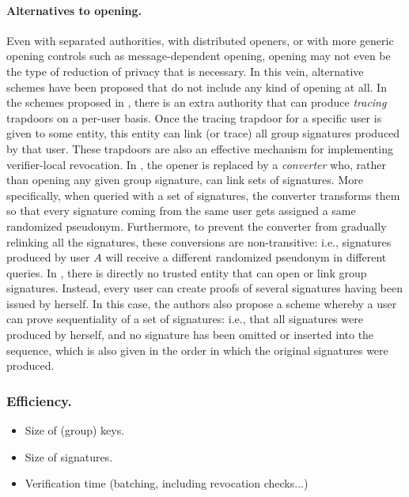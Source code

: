 \paragraph{Alternatives to opening.}
%
Even with separated authorities, with distributed openers, or with more generic
opening controls such as message-dependent opening, opening may not even be
the type of reduction of privacy that is necessary. In this vein, alternative
schemes have been proposed that do not include any kind of
opening at all.
%
In the schemes proposed in \cite{kty04,cpy06,bcly08}, there is an extra
authority that can produce \emph{tracing} trapdoors on a per-user basis.
Once the tracing trapdoor for a specific user is given to some entity, this
entity can link (or trace) all group signatures produced by that user.
These trapdoors are also an effective mechanism for implementing verifier-local
revocation.
%
In \cite{gl19}, the opener is replaced by a \emph{converter} who, rather than
opening any given group signature, can link sets of signatures. More
specifically, when queried with a set of signatures, the converter transforms
them so that every signature coming from the same user gets assigned a same
randomized pseudonym. Furthermore, to prevent the converter from gradually
relinking all the signatures, these conversions are non-transitive: i.e.,
signatures produced by user $A$ will receive a different randomized pseudonym in
different queries.
%
In \cite{dl21}, there is directly no trusted entity that can open or link group
signatures. Instead, every user can create proofs of several signatures having
been issued by herself. In this case, the authors also propose a scheme whereby
a user can prove sequentiality of a set of signatures: i.e., that all signatures
were produced by herself, and no signature has been omitted or inserted into the
sequence, which is also given in the order in which the original signatures were
produced.

\subsubsection{Efficiency.}


\begin{itemize}
\item Size of (group) keys.
\item Size of signatures.
\item Verification time (batching, including revocation checks...)
\end{itemize}

